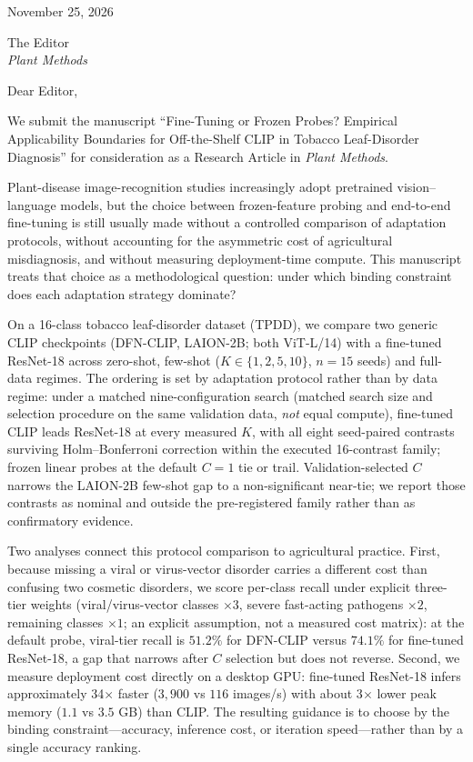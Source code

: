 \documentclass[10pt,a4paper]{article}
\begin{document}
November 25, 2026

The Editor\\
\emph{Plant Methods}

Dear Editor,

We submit the manuscript ``Fine-Tuning or Frozen Probes? Empirical Applicability Boundaries for Off-the-Shelf CLIP in Tobacco Leaf-Disorder Diagnosis'' for consideration as a Research Article in \emph{Plant Methods}.

Plant-disease image-recognition studies increasingly adopt pretrained vision--language models, but the choice between frozen-feature probing and end-to-end fine-tuning is still usually made without a controlled comparison of adaptation protocols, without accounting for the asymmetric cost of agricultural misdiagnosis, and without measuring deployment-time compute. This manuscript treats that choice as a methodological question: under which binding constraint does each adaptation strategy dominate?

On a 16-class tobacco leaf-disorder dataset (TPDD), we compare two generic CLIP checkpoints (DFN-CLIP, LAION-2B; both ViT-L/14) with a fine-tuned ResNet-18 across zero-shot, few-shot ($K\in\{1,2,5,10\}$, $n{=}15$ seeds) and full-data regimes. The ordering is set by adaptation protocol rather than by data regime: under a matched nine-configuration search (matched search size and selection procedure on the same validation data, \emph{not} equal compute), fine-tuned CLIP leads ResNet-18 at every measured $K$, with all eight seed-paired contrasts surviving Holm--Bonferroni correction within the executed 16-contrast family; frozen linear probes at the default $C{=}1$ tie or trail. Validation-selected $C$ narrows the LAION-2B few-shot gap to a non-significant near-tie; we report those contrasts as nominal and outside the pre-registered family rather than as confirmatory evidence.

Two analyses connect this protocol comparison to agricultural practice. First, because missing a viral or virus-vector disorder carries a different cost than confusing two cosmetic disorders, we score per-class recall under explicit three-tier weights (viral/virus-vector classes $\times3$, severe fast-acting pathogens $\times2$, remaining classes $\times1$; an explicit assumption, not a measured cost matrix): at the default probe, viral-tier recall is $51.2\%$ for DFN-CLIP versus $74.1\%$ for fine-tuned ResNet-18, a gap that narrows after $C$ selection but does not reverse. Second, we measure deployment cost directly on a desktop GPU: fine-tuned ResNet-18 infers approximately 34$\times$ faster ($3{,}900$ vs $116$ images/s) with about 3$\times$ lower peak memory ($1.1$ vs $3.5$ GB) than CLIP. The resulting guidance is to choose by the binding constraint---accuracy, inference cost, or iteration speed---rather than by a single accuracy ranking.
\end{document}
